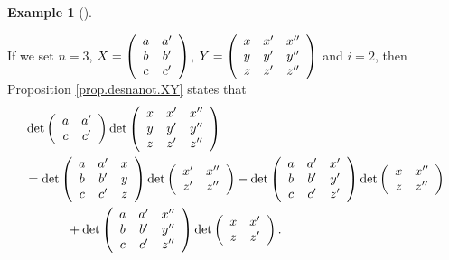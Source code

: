 \documentclass[numbers=enddot,12pt,final,onecolumn,notitlepage]{scrartcl}%
\theoremstyle{definition}
\newtheorem{exam}[theo]{Example}
\newenvironment{example}[1][]
{\begin{exam}[#1]\begin{leftbar}}
{\end{leftbar}\end{exam}}
\theoremstyle{plainsl}
\begin{document}
\begin{example}
If we set $n=3$, $X=\left(
\begin{array}
[c]{cc}%
a & a^{\prime}\\
b & b^{\prime}\\
c & c^{\prime}%
\end{array}
\right)  $, $Y=\left(
\begin{array}
[c]{ccc}%
x & x^{\prime} & x^{\prime\prime}\\
y & y^{\prime} & y^{\prime\prime}\\
z & z^{\prime} & z^{\prime\prime}%
\end{array}
\right)  $ and $i=2$, then Proposition \ref{prop.desnanot.XY} states that%
\begin{align*}
&  \det\left(
\begin{array}
[c]{cc}%
a & a^{\prime}\\
c & c^{\prime}%
\end{array}
\right)  \det\left(
\begin{array}
[c]{ccc}%
x & x^{\prime} & x^{\prime\prime}\\
y & y^{\prime} & y^{\prime\prime}\\
z & z^{\prime} & z^{\prime\prime}%
\end{array}
\right) \\
&  =\det\left(
\begin{array}
[c]{ccc}%
a & a^{\prime} & x\\
b & b^{\prime} & y\\
c & c^{\prime} & z
\end{array}
\right)  \det\left(
\begin{array}
[c]{cc}%
x^{\prime} & x^{\prime\prime}\\
z^{\prime} & z^{\prime\prime}%
\end{array}
\right)  -\det\left(
\begin{array}
[c]{ccc}%
a & a^{\prime} & x^{\prime}\\
b & b^{\prime} & y^{\prime}\\
c & c^{\prime} & z^{\prime}%
\end{array}
\right)  \det\left(
\begin{array}
[c]{cc}%
x & x^{\prime\prime}\\
z & z^{\prime\prime}%
\end{array}
\right) \\
&  \ \ \ \ \ \ \ \ \ \ +\det\left(
\begin{array}
[c]{ccc}%
a & a^{\prime} & x^{\prime\prime}\\
b & b^{\prime} & y^{\prime\prime}\\
c & c^{\prime} & z^{\prime\prime}%
\end{array}
\right)  \det\left(
\begin{array}
[c]{cc}%
x & x^{\prime}\\
z & z^{\prime}%
\end{array}
\right)  .
\end{align*}

\end{example}
\end{document}

